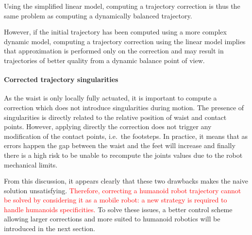 Using the simplified linear model, computing a trajectory correction is thus
the same problem as computing a dynamically balanced trajectory.

However, if the initial trajectory has been computed using a more complex
dynamic model, computing a trajectory correction using the linear model implies
that approximation is performed only on the correction and may result in
trajectories of better quality from a dynamic balance point of view.

\paragraph{Corrected trajectory singularities}
As the waist is only locally fully actuated, it is important to compute
a correction which does not introduce singularities during motion. The
presence of singularities is directly related to the relative position
of waist and contact points. However, applying directly the correction
does not trigger any modification of the contact points, i.e.\ the
footsteps. In practice, it means that as errors happen the gap between
the waist and the feet will increase and finally there is a high risk
to be unable to recompute the joints values due to the robot
mechanical limits.


From this discussion, it appears clearly that these two drawbacks
makes the naive solution unsatisfying. \textcolor{red}{Therefore,
  correcting a humanoid robot trajectory cannot be solved by
  considering it as a mobile robot: a new strategy is required to
  handle humanoids specificities.}  To solve these issues, a better
control scheme allowing larger corrections and more suited to humanoid
robotics will be introduced in the next section.


\FloatBarrier

